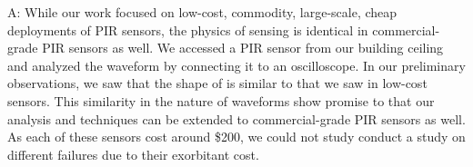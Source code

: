 \begin{description}[style=nextline]
	\item[Q: Does \sol work with high-grade PIR sensors?]
	A:  While our work focused on low-cost, commodity, large-scale, cheap deployments of PIR sensors, the physics of sensing is identical in commercial-grade PIR sensors as well. We accessed a PIR sensor from our building ceiling and analyzed the \aout waveform by connecting it to an oscilloscope. In our preliminary observations, we saw that the shape of \aout is similar to that we saw in low-cost sensors. %
	This similarity in the nature of \aout waveforms show promise to that our analysis and techniques can be extended to commercial-grade PIR sensors as well. As each of these sensors cost around \$200, we could not study conduct a study on different failures due to their exorbitant cost.
\end{description}




